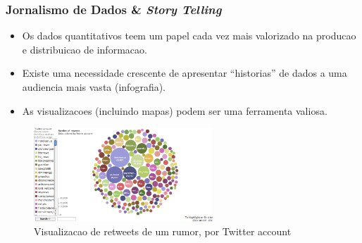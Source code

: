 \documentclass[hyperref={pdfpagelabels=true}]{beamer}
\begin{document}
\begin{frame}
\frametitle{Jornalismo de Dados \& \textit{Story Telling}}
      \begin{itemize}         
        \item<1->Os dados quantitativos teem um papel cada vez mais valorizado na producao e distribuicao de informacao.
        \item<2->Existe uma necessidade crescente de apresentar ``historias'' de dados a uma audiencia mais vasta (infografia).
        \item<3->As visualizacoes (incluindo mapas) podem ser uma ferramenta valiosa.
       \end{itemize}            
          
        \begin{figure}   
            \includegraphics[width=0.6\textwidth]{guardian.png}\\
         \tiny{Visualizacao de retweets de um rumor, por Twitter account}%
        \end{figure} 

\end{frame}
\end{document}
